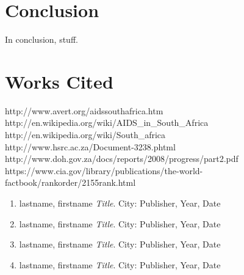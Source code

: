 \documentclass[12pt]{article}
\begin{document}
\section{Conclusion}
In conclusion, stuff.

\section{Works Cited}
http://www.avert.org/aidssouthafrica.htm\\
http://en.wikipedia.org/wiki/AIDS\_in\_South\_Africa\\
http://en.wikipedia.org/wiki/South\_africa\\
http://www.hsrc.ac.za/Document-3238.phtml\\
http://www.doh.gov.za/docs/reports/2008/progress/part2.pdf\\
https://www.cia.gov/library/publications/the-world-factbook/rankorder/2155rank.html\\

\begin{enumerate}

\item lastname, firstname \textit{Title}. City: Publisher, Year, Date
\item lastname, firstname \textit{Title}. City: Publisher, Year, Date
\item lastname, firstname \textit{Title}. City: Publisher, Year, Date
\item lastname, firstname \textit{Title}. City: Publisher, Year, Date

\end{enumerate}
\end{document}
